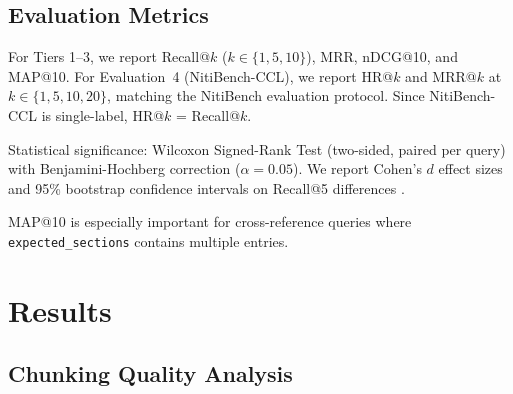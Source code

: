 \documentclass[sn-mathphys,Numbered]{sn-jnl}%
\begin{document}
\subsection{Evaluation Metrics}

For Tiers 1--3, we report Recall@$k$ ($k\in\{1,5,10\}$), MRR, nDCG@10,
and MAP@10.  For Evaluation~4 (NitiBench-CCL), we report HR@$k$ and MRR@$k$
at $k\in\{1,5,10,20\}$, matching the NitiBench evaluation protocol.
Since NitiBench-CCL is single-label, HR@$k$ = Recall@$k$.

Statistical significance: Wilcoxon Signed-Rank Test (two-sided, paired per
query) with Benjamini-Hochberg correction ($\alpha = 0.05$).  We report
Cohen's $d$ effect sizes \cite{cohen1988statistical} and 95\% bootstrap
confidence intervals on Recall@5 differences \cite{dror-etal-2018-hitchhikers}.

MAP@10 is especially important for cross-reference queries where
\texttt{expected\_sections} contains multiple entries.

\section{Results}
\label{sec:results}

\subsection{Chunking Quality Analysis}
\label{sec:chunking_quality}
\end{document}
